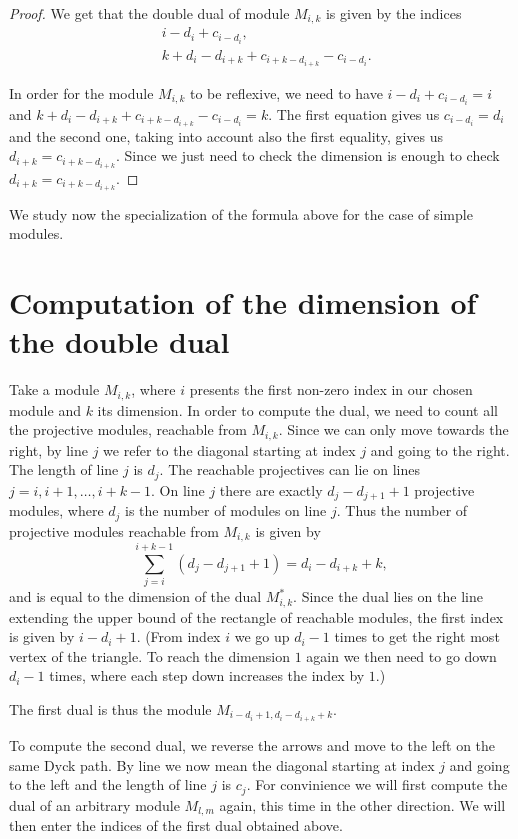 \documentclass[12pt, a4paper]{article}
\numberwithin{equation}{section}
\theoremstyle{definition}
\theoremstyle{plain}
\theoremstyle{remark}
\begin{document}
\begin{proof}
We get that the double dual of module $M_{i,k}$ is given by the indices
\begin{align*}
    &i - d_i + c_{i - d_i}, \\
    &k + d_i - d_{i+k} + c_{i+k-{d_{i+k}}} - c_{i-d_i}.
\end{align*}

In order for the module $M_{i,k}$ to be reflexive, we need to have $i - d_i + c_{i - d_i} = i$ and $k + d_i - d_{i+k} + c_{i+k-{d_{i+k}}} - c_{i-d_i} = k$.
The first equation gives us $c_{i - d_i} = d_i$ and the second one, taking into account also the first equality, gives us $d_{i+k} = c_{i+k-{d_{i+k}}}$.
Since we just need to check the dimension is enough to check $d_{i+k}=c_{i+k-d_{i+k}}$.
\end{proof}
We study now the specialization of the formula above for the case of simple modules.


\section{Computation of the dimension of the double dual}
Take a module $M_{i,k}$, where $i$ presents the first non-zero index in our chosen module and $k$ its dimension. 
In order to compute the dual, we need to count all the projective modules, reachable from $M_{i,k}$. 
Since we can only move towards the right, by line $j$ we refer to the diagonal starting at index $j$ and going to the right. The length of line $j$ is $d_j$.
The reachable projectives can lie on lines $j = i, i+1, \dots, i+k-1$.
On line $j$ there are exactly $d_j - d_{j+1} + 1$ projective modules, where $d_j$ is the number of modules on line $j$.
Thus the number of projective modules reachable from $M_{i,k}$ is given by
\begin{equation}
\label{eq:reachable}
\sum_{j=i}^{i+k-1} (d_j - d_{j+1} + 1) = d_i - d_{i+k} + k,
\end{equation}
and is equal to the dimension of the dual $M^*_{i,k}$.
Since the dual lies on the line extending the upper bound of the rectangle of reachable modules, the first index is given by $i - d_i + 1$.
(From index $i$ we go up $d_i - 1$ times to get the right most vertex of the triangle. To reach the dimension $1$ again we then need to go down $d_i - 1$ times, where each step down increases the index by $1$.)

The first dual is thus the module $M_{i - d_i + 1, d_i - d_{i+k} + k}$.

To compute the second dual, we reverse the arrows and move to the left on the same Dyck path. By line we now mean the diagonal starting at index $j$ and going to the left and the length of line $j$ is $c_j$.
For convinience we will first compute the dual of an arbitrary module $M_{l,m}$ again, this time in the other direction. We will then enter the indices of the first dual obtained above.
\end{document}
